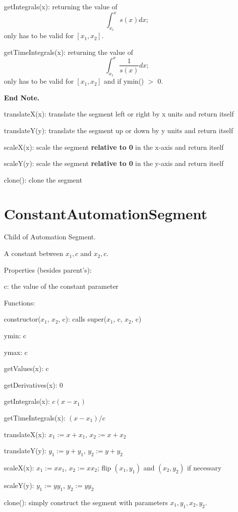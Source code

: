 \documentclass{article}
\begin{document}
getIntegrals(x): returning the value of $$\int_{x_1}^x s(x) dx;$$ only has to be valid for $[x_1, x_2]$.

getTimeIntegrals(x): returning the value of $$\int_{x_1}^x \frac{1}{s(x)} dx;$$ only has to be valid for $[x_1, x_2]$ and if ymin() $>$ 0.

\textbf{End Note.}

translateX(x): translate the segment left or right by x units and return itself

translateY(y): translate the segment up or down by y units and return itself

scaleX(x): scale the segment \textbf{relative to 0} in the x-axis and return itself

scaleY(y): scale the segment \textbf{relative to 0} in the y-axis and return itself

clone(): clone the segment



\section{ConstantAutomationSegment}

Child of Automation Segment.

A constant between $x_1, c$ and $x_2, c$.

Properties (besides parent's):

c: the value of the constant parameter

Functions:

constructor($x_1$, $x_2$, c): calls super($x_1$, c, $x_2$, c)

ymin: c

ymax: c

getValues(x): c

getDerivatives(x): 0

getIntegrals(x): $c(x-x_1)$

getTimeIntegrals(x): $(x-x_1)/c$

translateX(x): $x_1:=x+x_1$, $x_2:=x+x_2$

translateY(y): $y_1:=y+y_1$, $y_2:=y+y_2$

scaleX(x): $x_1:=xx_1$, $x_2:=xx_2$; flip $(x_1, y_1)$ and $(x_2, y_2)$ if necessary

scaleY(y): $y_1:=yy_1$, $y_2:=yy_2$

clone(): simply construct the segment with parameters $x_1, y_1, x_2, y_2$.
\end{document}
